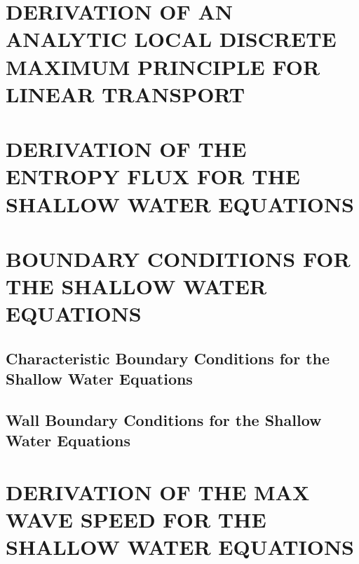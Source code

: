 \begin{appendices}
\renewcommand{\appendixname}{APPENDIX}

\chapter{DERIVATION OF AN ANALYTIC LOCAL DISCRETE MAXIMUM PRINCIPLE FOR LINEAR
  TRANSPORT\label{sec:analytic_dmp}}
  
\chapter{DERIVATION OF THE ENTROPY FLUX FOR THE SHALLOW WATER EQUATIONS
\label{sec:shallow_water_entropy_flux}}
  
\chapter{BOUNDARY CONDITIONS FOR THE SHALLOW WATER EQUATIONS
\label{sec:boundary_conditions}}
  \section{Characteristic Boundary Conditions for the Shallow Water Equations}
    
  \section{Wall Boundary Conditions for the Shallow Water Equations}
    
\chapter{DERIVATION OF THE MAX WAVE SPEED FOR THE SHALLOW WATER EQUATIONS
\label{app:shallow_water_max_wave_speed}}
  

\end{appendices}
